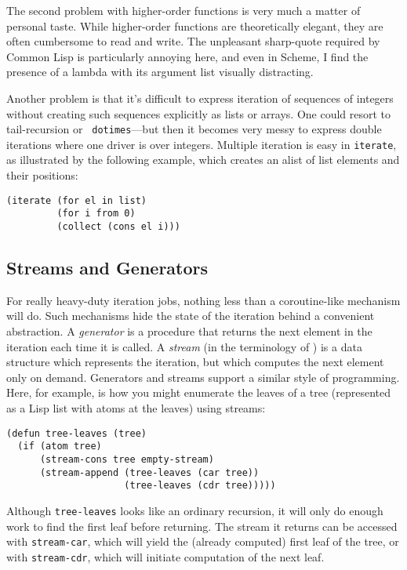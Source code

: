 \documentclass[12pt]{article}
\newcommand{\lisp}{\tt}
\newcommand{\iter}{{\lisp iterate}}
\begin{document}
The second problem with higher-order functions is very much a matter
of personal taste.  While higher-order functions are theoretically
elegant, they are often cumbersome to read and write.  The unpleasant
sharp-quote required by Common Lisp is particularly annoying here, and
even in Scheme, I find the presence of a lambda with its argument list
visually distracting.

Another problem is that it's difficult to express iteration of
sequences of integers without creating such sequences explicitly as
lists or arrays.  One could resort to tail-recursion or {\lisp
dotimes}---but then it becomes very messy to  express double
iterations where one driver is over integers.  Multiple iteration is
easy in \iter, as illustrated by the following example, which creates
an alist of list elements and their positions: 

{\samepage
\begin{verbatim}
(iterate (for el in list)
         (for i from 0)
         (collect (cons el i)))
\end{verbatim}
}


\subsection{Streams and Generators}

For really heavy-duty iteration jobs, nothing less than a
coroutine-like mechanism will do.  Such mechanisms hide the state of
the iteration behind a convenient abstraction.  A {\em generator\/} is
a procedure that returns the next element in the iteration each time
it is called.  A {\em stream\/} (in the terminology of
\cite{SchemeBook}) is a data structure which represents the iteration,
but which computes the next element only on demand.  Generators and
streams support a similar style of programming.  Here, for example, is
how you might enumerate the leaves of a tree (represented as a Lisp
list with atoms at the leaves) using streams:
\begin{verbatim}
(defun tree-leaves (tree)
  (if (atom tree)
      (stream-cons tree empty-stream)
      (stream-append (tree-leaves (car tree)) 
                     (tree-leaves (cdr tree)))))
\end{verbatim}

Although {\lisp tree-leaves} looks like an ordinary recursion, 
it will only do enough work to find the first leaf before returning.
The stream it returns can be accessed with {\lisp stream-car}, which
will yield the (already computed) first leaf of the tree, or with
{\lisp stream-cdr}, which will initiate computation of the next leaf.
\end{document}
